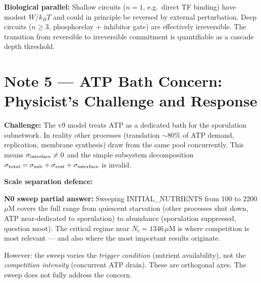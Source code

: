 \documentclass[11pt,a4paper]{article}
\begin{document}
\textbf{Biological parallel:}
Shallow circuits ($n = 1$, e.g.\ direct TF binding) have modest $W/k_BT$
and could in principle be reversed by external perturbation. Deep circuits
($n \geq 3$, phosphorelay + inhibitor gate) are effectively irreversible.
The transition from reversible to irreversible commitment is quantifiable
as a cascade depth threshold.

\section*{Note 5 — ATP Bath Concern: Physicist's Challenge and Response}

\textbf{Challenge:} The v9 model treats ATP as a dedicated bath for the
sporulation subnetwork. In reality other processes (translation $\sim 80\%$
of ATP demand, replication, membrane synthesis) draw from the same pool
concurrently. This means $\sigma_{\rm interface} \neq 0$ and the simple
subsystem decomposition $\sigma_{\rm total} = \sigma_{\rm sub} +
\sigma_{\rm rest} + \sigma_{\rm interface}$ is invalid.

\textbf{Scale separation defence:}

\textbf{N0 sweep partial answer:}
Sweeping INITIAL\_NUTRIENTS from 100 to 2200\,$\mu$M covers the full
range from quiescent starvation (other processes shut down, ATP
near-dedicated to sporulation) to abundance (sporulation suppressed,
question moot). The critical regime near $N_c = 1346\,\mu$M is where
competition is most relevant — and also where the most important results
originate.

However: the sweep varies the \emph{trigger condition} (nutrient
availability), not the \emph{competition intensity} (concurrent ATP
drain). These are orthogonal axes. The sweep does not fully address the
concern.
\end{document}
